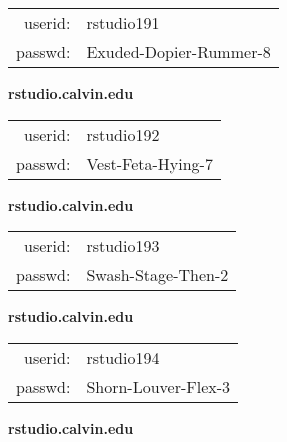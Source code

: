 \documentclass{article}\usepackage[]{graphicx}\usepackage[]{color}
\begin{document}
\begin{multicols}{3}
\begin{minipage}{.3\textwidth}
\begin{tabular}{rl}
userid: & rstudio191\\
passwd: & Exuded-Dopier-Rummer-8

\vspace{5mm}

\end{tabular}\end{minipage}

\vspace{5mm}

\begin{minipage}{.3\textwidth}
\centerline{\textbf{rstudio.calvin.edu}}
\medskip
\begin{tabular}{rl}

userid: & rstudio192\\
passwd: & Vest-Feta-Hying-7

\vspace{5mm}

\end{tabular}\end{minipage}

\vspace{5mm}

\begin{minipage}{.3\textwidth}
\centerline{\textbf{rstudio.calvin.edu}}
\medskip
\begin{tabular}{rl}

userid: & rstudio193\\
passwd: & Swash-Stage-Then-2

\vspace{5mm}

\end{tabular}\end{minipage}

\vspace{5mm}

\begin{minipage}{.3\textwidth}
\centerline{\textbf{rstudio.calvin.edu}}
\medskip
\begin{tabular}{rl}

userid: & rstudio194\\
passwd: & Shorn-Louver-Flex-3

\vspace{5mm}

\end{tabular}\end{minipage}

\vspace{5mm}

\begin{minipage}{.3\textwidth}
\centerline{\textbf{rstudio.calvin.edu}}
\medskip
\begin{tabular}{rl}


\end{tabular}
\end{minipage}
\end{multicols}
\end{document}
